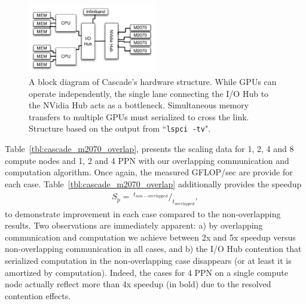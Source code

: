 \begin{figure}
\centering
\includegraphics[width=0.5\textwidth]{gpu_content/omnigraffle/CascadeIOHub.pdf}
\caption{A block diagram of Cascade's hardware structure. While GPUs can operate independently, the single lane connecting the I/O Hub to the NVidia Hub acts as a bottleneck. Simultaneous memory transfers to multiple GPUs must serialized to cross the link. Structure based on the output from ``\texttt{lspci -tv}". }
\label{fig:cascade_iohub}
\end{figure}

Table~\ref{tbl:cascade_m2070_overlap}, presents the scaling data for 1, 2, 4 and 8 compute nodes and 1, 2 and 4 PPN with our overlapping communication and computation algorithm. Once again, the measured GFLOP/sec are provide for each case. Table~\ref{tbl:cascade_m2070_overlap} additionally provides the speedup
\begin{align*} 
S_p = \ ^{t_{non-overlapped}} /_{t_{overlapped}},
\end{align*}
to demonstrate improvement in each case compared to the non-overlapping results. Two observations are immediately apparent: a) by overlapping communication and computation we achieve between 2x and 5x speedup versus non-overlapping communication in all cases, and b) the I/O Hub contention that serialized computation in the non-overlapping case disappears (or at least it is amortized by computation). Indeed, the cases for 4 PPN on a single compute node actually reflect more than 4x speedup (in bold) due to the resolved contention effects. 


